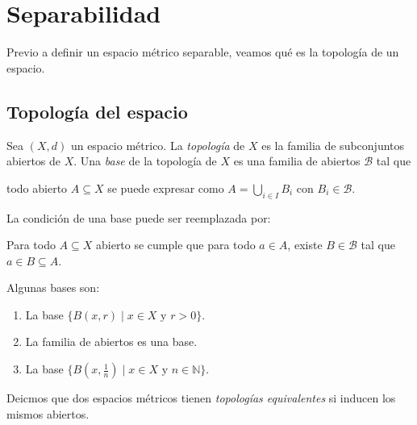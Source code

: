 \chapter{Separabilidad}

Previo a definir un espacio métrico separable, veamos qué es la topología de un espacio.

\section{Topología del espacio}

\begin{definition}
	Sea $(X, d)$ un espacio métrico. La \emph{topología} de $X$ es la familia de subconjuntos abiertos de $X$. Una \emph{base} de la topología de $X$ es una familia de abiertos $\mathcal{B}$ tal que
	\begin{center}
		\begin{minipage}{0.9\linewidth}
			todo abierto $A \subseteq X$ se puede expresar como $A = \bigcup_{i \in I} B_i$ con $B_i \in \mathcal{B}$.
		\end{minipage}
	\end{center}
\end{definition}
\begin{remark}
	La condición de una base puede ser reemplazada por:
	\begin{center}
		\begin{minipage}{0.9\linewidth}
			Para todo $A \subseteq X$ abierto se cumple que para todo $a \in A$, existe $B \in \mathcal{B}$ tal que $a \in B \subseteq A$.
		\end{minipage}
	\end{center}
\end{remark}

\begin{example}
	Algunas bases son:
	\begin{enumerate}
		\item La base $\{ B(x, r) \mid x \in X \text{ y } r > 0 \}$.
		\item La familia de abiertos es una base.
		\item La base $\{ B(x, \frac{1}{n}) \mid x \in X \text{ y } n \in \mathbb{N} \}$.
	\end{enumerate}
\end{example}

\begin{definition}
	Deicmos que dos espacios métricos tienen \emph{topologías equivalentes} si inducen los mismos abiertos.
\end{definition}

